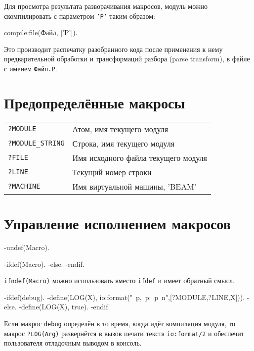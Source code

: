 Для просмотра результата разворачивания макросов, модуль можно скомпилировать с
параметром \texttt{'P'} таким образом:

\begin{erlangru}
compile:file(Файл, ['P']).
\end{erlangru}

Это производит распечатку разобранного кода после применения к нему предварительной
обработки и трансформаций разбора (parse transform), в файле с именем 
\texttt{Файл.P}.


\section{Предопределённые макросы}

\begin{center}
\begin{tabular}{|>{\raggedright}p{110pt}|>{\raggedright}p{250pt}|}
\hline
\multicolumn{2}{|p{330pt}|}{Предопределённые макросы}\tabularnewline
\hline
\texttt{?MODULE} & 
Атом, имя текущего модуля \tabularnewline
\hline
\texttt{?MODULE\_STRING} & 
Строка, имя текущего модуля \tabularnewline
\hline
\texttt{?FILE} & 
Имя исходного файла текущего модуля \tabularnewline
\hline
\texttt{?LINE} & 
Текущий номер строки \tabularnewline
\hline
\texttt{?MACHINE} & 
Имя виртуальной машины, 'BEAM'\tabularnewline
\hline
\end{tabular}
\end{center}


\section{Управление исполнением макросов}

\begin{erlang}
-undef(Macro).      %

-ifdef(Macro).
-else.
-endif.
\end{erlang}

\texttt{ifndef(Macro)} можно использовать вместо \texttt{ifdef} и имеет обратный
смысл.

\begin{erlang}
-ifdef(debug).
-define(LOG(X), io:format("{~p,~p}:~p~n",[?MODULE,?LINE,X])).
-else.
-define(LOG(X), true).
-endif.
\end{erlang}

Если макрос \texttt{debug} определён в то время, когда идёт компиляция модуля, то
макрос \texttt{?LOG(Arg)} развернётся в вызов печати текста \texttt{io:format/2}
и обеспечит пользователя отладочным выводом в консоль.



